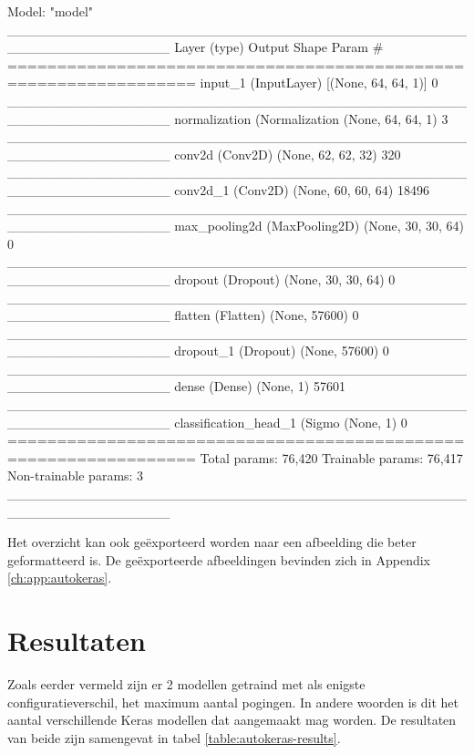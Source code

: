 \begin{python}
Model: "model"
_________________________________________________________________
Layer (type)                 Output Shape              Param #   
=================================================================
input_1 (InputLayer)         [(None, 64, 64, 1)]       0         
_________________________________________________________________
normalization (Normalization (None, 64, 64, 1)         3         
_________________________________________________________________
conv2d (Conv2D)              (None, 62, 62, 32)        320       
_________________________________________________________________
conv2d_1 (Conv2D)            (None, 60, 60, 64)        18496     
_________________________________________________________________
max_pooling2d (MaxPooling2D) (None, 30, 30, 64)        0         
_________________________________________________________________
dropout (Dropout)            (None, 30, 30, 64)        0         
_________________________________________________________________
flatten (Flatten)            (None, 57600)             0         
_________________________________________________________________
dropout_1 (Dropout)          (None, 57600)             0         
_________________________________________________________________
dense (Dense)                (None, 1)                 57601     
_________________________________________________________________
classification_head_1 (Sigmo (None, 1)                 0         
=================================================================
Total params: 76,420
Trainable params: 76,417
Non-trainable params: 3
_________________________________________________________________
\end{python}

Het overzicht kan ook geëxporteerd worden naar een afbeelding die beter geformatteerd is. De geëxporteerde afbeeldingen bevinden zich in Appendix \ref{ch:app:autokeras}.

\section{Resultaten}
\label{sec:results-autokeras}

Zoals eerder vermeld zijn er 2 modellen getraind met als enigste configuratieverschil, het maximum aantal pogingen. In andere woorden is dit het aantal verschillende Keras modellen dat aangemaakt mag worden. De resultaten van beide zijn samengevat in tabel \ref{table:autokeras-results}. 

